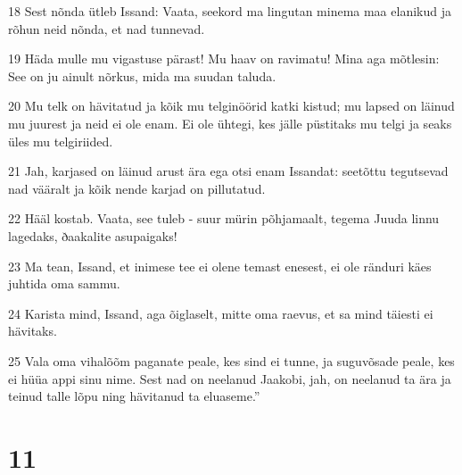 \par 18 Sest nõnda ütleb Issand: Vaata, seekord ma lingutan minema maa elanikud ja rõhun neid nõnda, et nad tunnevad.
\par 19 Häda mulle mu vigastuse pärast! Mu haav on ravimatu! Mina aga mõtlesin: See on ju ainult nõrkus, mida ma suudan taluda.
\par 20 Mu telk on hävitatud ja kõik mu telginöörid katki kistud; mu lapsed on läinud mu juurest ja neid ei ole enam. Ei ole ühtegi, kes jälle püstitaks mu telgi ja seaks üles mu telgiriided.
\par 21 Jah, karjased on läinud arust ära ega otsi enam Issandat: seetõttu tegutsevad nad vääralt ja kõik nende karjad on pillutatud.
\par 22 Hääl kostab. Vaata, see tuleb - suur mürin põhjamaalt, tegema Juuda linnu lagedaks, ðaakalite asupaigaks!
\par 23 Ma tean, Issand, et inimese tee ei olene temast enesest, ei ole ränduri käes juhtida oma sammu.
\par 24 Karista mind, Issand, aga õiglaselt, mitte oma raevus, et sa mind täiesti ei hävitaks.
\par 25 Vala oma vihalõõm paganate peale, kes sind ei tunne, ja suguvõsade peale, kes ei hüüa appi sinu nime. Sest nad on neelanud Jaakobi, jah, on neelanud ta ära ja teinud talle lõpu ning hävitanud ta eluaseme.”

\chapter{11}

